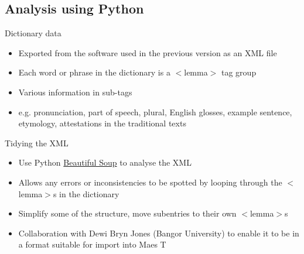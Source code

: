 \documentclass[handout]{beamer}
\begin{document}
\subsection{Analysis using Python}
\begin{frame}{Dictionary data}
 \begin{itemize}
  \item<1-> Exported from the software used in the previous version as an XML file
  \item<2-> Each word or phrase in the dictionary is a $<$lemma$>$ tag group
  \item<3-> Various information in sub-tags
  \item<4-> e.g. pronunciation, part of speech, plural, English glosses, example sentence, etymology, attestations in the traditional texts  
 \end{itemize}
 \end{frame}
\begin{frame}{Tidying the XML}
\begin{itemize}
  \item<1-> Use Python \href{https://www.crummy.com/software/BeautifulSoup/}{Beautiful Soup} to analyse the XML
  \item<2-> Allows any errors or inconsistencies to be spotted by looping through the $<$lemma$>$s in the dictionary     
  \item<3-> Simplify some of the structure, move subentries to their own $<$lemma$>$s
  \item<4-> Collaboration with Dewi Bryn Jones (Bangor University) to enable it to be in a format suitable for import into Maes T
\end{itemize}
\end{frame} 
\end{document}
